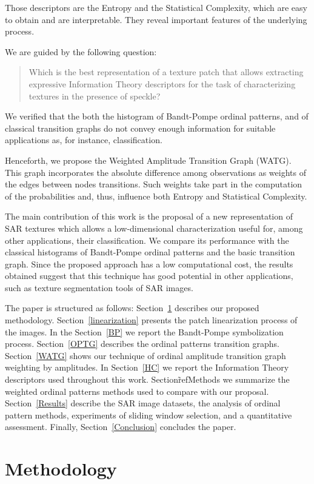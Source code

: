 \documentclass[journal]{IEEEtran}
\begin{document}
Those descriptors are the Entropy and the Statistical Complexity, which are easy to obtain and are interpretable.
They reveal important features of the underlying process.

We are guided by the following question:
\begin{quote}
Which is the best representation of a texture patch that allows extracting expressive Information Theory descriptors for the task of characterizing textures in the presence of speckle?
\end{quote}
We verified that the both the histogram of Bandt-Pompe ordinal patterns, and of classical transition graphs do not convey enough information for suitable applications as, for instance, classification.

Henceforth, we propose the Weighted Amplitude Transition Graph (WATG).
This graph incorporates the absolute difference among observations as weights of the edges between nodes transitions.
Such weights take part in the computation of the probabilities and, thus, influence both Entropy and Statistical Complexity.

The main contribution of this work is the proposal of a new representation of SAR textures which allows a low-dimensional characterization useful for, among other applications, their classification.
We compare its performance with the classical histograms of Bandt-Pompe ordinal patterns and the basic transition graph.
Since the proposed approach has a low computational cost, the results obtained suggest that this technique has good potential in other applications, such as texture segmentation tools of SAR images.

The paper is structured as follows:
Section~\ref{methodology} describes our proposed methodology.
Section~\ref{linearization} presents the patch linearization process of the images.
In the Section~\ref{BP} we report the Bandt-Pompe symbolization process.
Section~\ref{OPTG} describes the ordinal patterns transition graphs.
Section~\ref{WATG} shows our technique of ordinal amplitude transition graph weighting by amplitudes.
In Section~\ref{HC} we report the Information Theory descriptors used throughout this work.
Section\~ref{Methods} we summarize the weighted ordinal patterns methods used to compare with our proposal.
Section~\ref{Results} describe the SAR image datasets, 
the analysis of ordinal pattern methods, 
experiments of sliding window selection, 
and a quantitative assessment.
Finally, Section~\ref{Conclusion} concludes the paper.

\section{Methodology}\label{methodology}
\end{document}
